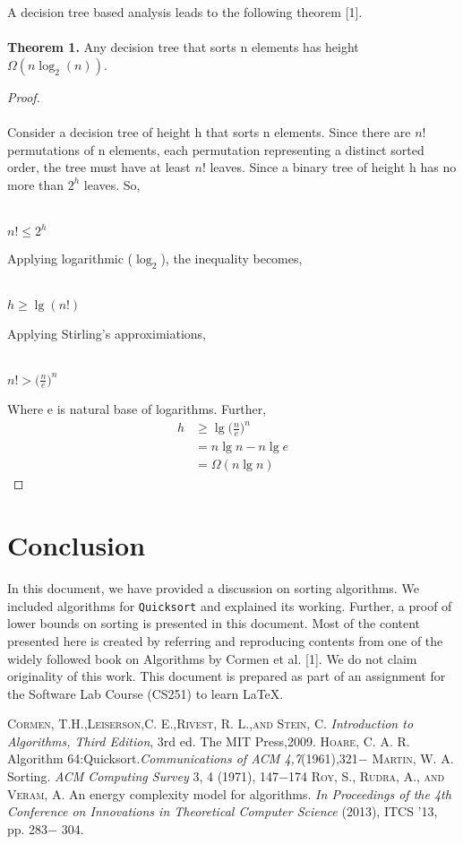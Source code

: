 \documentclass[a4paper, 10pt,twocolumn]{article}
\begin{document}
A decision tree based analysis leads to the following theorem [1].
\\\\\textbf{Theorem 1.} Any decision tree that sorts n elements has height $\Omega(n\log_2 (n))$.
\begin{proof}
\\\\  Consider a decision tree of height h that sorts n elements. Since there are $n!$ permutations of n elements, each permutation representing a distinct sorted order, the tree must have at least $n!$ leaves. Since a binary tree of height h has no more than $2^h$ leaves. So,
\begin{flushleft}
\\$n! \leq 2^h$\\
\end{flushleft}
Applying logarithmic ($\log_2$), the inequality becomes,
\begin{flushleft}
\\$h \geq \lg (n!)$\\
\end{flushleft}
Applying Stirling's approximiations,
\begin{flushleft}
  \\$n! > \Big(\frac{n}{e}\Big)^n$\\
\end{flushleft}
Where e is natural base of logarithms. Further,
\begin{align*}
  h  & \geq \lg \Big(\frac{n}{e} \Big)^n \\
   &=n\lg n-n\lg e \\
   &=\Omega(n\lg n) 
\end{align*}
\end{proof}
\section{Conclusion}
\noindent
In this document, we have provided a discussion
on sorting algorithms. We included algorithms for
\texttt{Quicksort} and explained its working. Further, a
proof of lower bounds on sorting is presented in this
document. Most of the content presented here is
created by referring and reproducing contents from
one of the widely followed book on Algorithms by Cormen et al. [1]. We do not claim originality of this work. This document is prepared as part of an assignment for the Software Lab Course (CS251) to learn \LaTeX .
\begin{thebibliography}{25}
   {\scshape Cormen, T.H.,Leiserson,C. E.,Rivest, R. L.,and Stein, C.} \textit{Introduction to Algorithms, Third Edition}, 3rd ed. The MIT Press,2009.
   \textsc{Hoare, C. A. R.} Algorithm 64:Quicksort.\textit{Communications of ACM 4,7}(1961),321$-$
  \bibitem{} {\scshape Martin, W. A.} Sorting. \textit{ACM Computing Survey} 3, 4 (1971), 147$-$174
  \bibitem{} \textsc{Roy, S., Rudra, A., and Veram, A.} An energy complexity model for algorithms. \textit{In Proceedings of the 4th Conference on Innovations in Theoretical Computer Science }(2013), ITCS '13, pp. 283$-$ 304.
\end{thebibliography}
\end{document}
